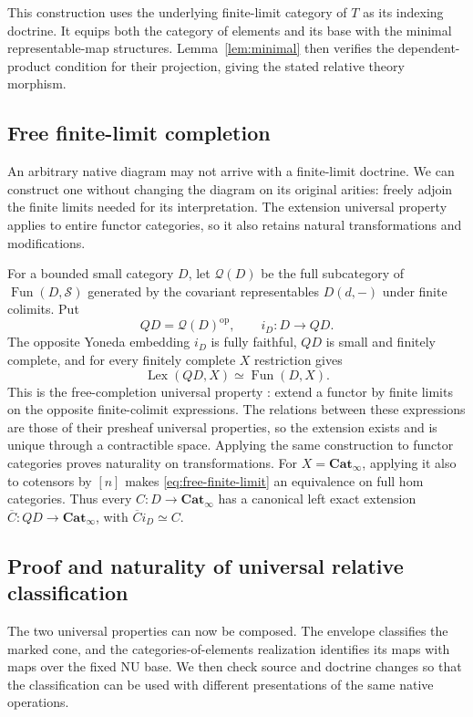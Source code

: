 \documentclass[oneside]{article}
\theoremstyle{plain}
\theoremstyle{definition}
\theoremstyle{remark}
\newcommand{\Cat}{\mathbf{Cat}_{\infty}}
\newcommand{\Fun}{\operatorname{Fun}}
\newcommand{\Lex}{\operatorname{Lex}}
\newcommand{\Sps}{\mathcal S}
\newcommand{\op}{\mathrm{op}}
\begin{document}
This construction uses the underlying finite-limit category of $T$
as its indexing doctrine. It equips both the category of elements
and its base with the minimal representable-map structures.
Lemma~\ref{lem:minimal} then verifies the dependent-product condition
for their projection, giving the stated relative theory morphism.

\subsection{Free finite-limit completion}\label{subsec:free-completion}

An arbitrary native diagram may not arrive with a finite-limit doctrine.
We can construct one without changing the diagram on its original
arities: freely adjoin the finite limits needed for its interpretation.
The extension universal property applies to entire functor categories,
so it also retains natural transformations and modifications.

For a bounded small category $D$, let $\mathcal Q(D)$ be the full
subcategory of $\Fun(D,\Sps)$ generated by the covariant representables
$D(d,-)$ under finite colimits. Put
\[
 QD=\mathcal Q(D)^{\op},\qquad i_D:D\longrightarrow QD.
\]
The opposite Yoneda embedding $i_D$ is fully faithful, $QD$ is small
and finitely complete, and for every finitely complete $X$ restriction
gives
\begin{equation}\label{eq:free-finite-limit}
 \Lex(QD,X)\simeq\Fun(D,X).
\end{equation}
This is the free-completion universal property
\cite[Prop.~5.3.6.2]{Lurie2009}: extend a functor by finite limits on
the opposite finite-colimit expressions. The relations between these
expressions are those of their presheaf universal properties, so the
extension exists and is unique through a contractible space. Applying
the same construction to functor categories proves naturality on
transformations. For $X=\Cat$, applying it also to cotensors by $[n]$
makes \eqref{eq:free-finite-limit} an equivalence on full hom categories.
Thus every $C:D\to\Cat$ has a canonical left exact extension
$\overline C:QD\to\Cat$, with $\overline C i_D\simeq C$.
\subsection{Proof and naturality of universal relative classification}

The two universal properties can now be composed. The envelope classifies
the marked cone, and the categories-of-elements realization identifies
its maps with maps over the fixed NU base. We then check source and
doctrine changes so that the classification can be used with different
presentations of the same native operations.
\end{document}
